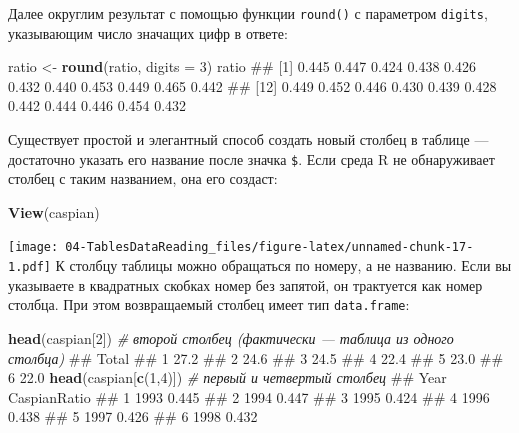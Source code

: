 \documentclass[]{book}
\newenvironment{Shaded}{\begin{snugshade}}{\end{snugshade}}
\newcommand{\KeywordTok}[1]{\textcolor[rgb]{0.13,0.29,0.53}{\textbf{#1}}}
\newcommand{\DataTypeTok}[1]{\textcolor[rgb]{0.13,0.29,0.53}{#1}}
\newcommand{\DecValTok}[1]{\textcolor[rgb]{0.00,0.00,0.81}{#1}}
\newcommand{\StringTok}[1]{\textcolor[rgb]{0.31,0.60,0.02}{#1}}
\newcommand{\CommentTok}[1]{\textcolor[rgb]{0.56,0.35,0.01}{\textit{#1}}}
\newcommand{\OperatorTok}[1]{\textcolor[rgb]{0.81,0.36,0.00}{\textbf{#1}}}
\newcommand{\NormalTok}[1]{#1}
\begin{document}
Далее округлим результат с помощью функции \texttt{round()} с параметром
\texttt{digits}, указывающим число значащих цифр в ответе:

\begin{Shaded}
\begin{Highlighting}[]
\NormalTok{ratio <-}\StringTok{ }\KeywordTok{round}\NormalTok{(ratio, }\DataTypeTok{digits =} \DecValTok{3}\NormalTok{)}
\NormalTok{ratio}
\NormalTok{##  [1] 0.445 0.447 0.424 0.438 0.426 0.432 0.440 0.453 0.449 0.465 0.442}
\NormalTok{## [12] 0.449 0.452 0.446 0.430 0.439 0.428 0.442 0.444 0.446 0.454 0.432}
\end{Highlighting}
\end{Shaded}

Существует простой и элегантный способ создать новый столбец в таблице
--- достаточно указать его название после значка \texttt{\$}. Если среда
R не обнаруживает столбец с таким названием, она его создаст:

\begin{Shaded}
\end{Shaded}

\begin{Shaded}
\begin{Highlighting}[]
\KeywordTok{View}\NormalTok{(caspian)}
\end{Highlighting}
\end{Shaded}

\texttt{[image: 04-TablesDataReading\_files/figure-latex/unnamed-chunk-17-1.pdf]}
К столбцу таблицы можно обращаться по номеру, а не названию. Если вы
указываете в квадратных скобках номер без запятой, он трактуется как
номер столбца. При этом возвращаемый столбец имеет тип
\texttt{data.frame}:

\begin{Shaded}
\begin{Highlighting}[]
\KeywordTok{head}\NormalTok{(caspian[}\DecValTok{2}\NormalTok{])  }\CommentTok{# второй столбец (фактически — таблица из одного столбца)}
\NormalTok{##   Total}
\NormalTok{## 1  27.2}
\NormalTok{## 2  24.6}
\NormalTok{## 3  24.5}
\NormalTok{## 4  22.4}
\NormalTok{## 5  23.0}
\NormalTok{## 6  22.0}
\KeywordTok{head}\NormalTok{(caspian[}\KeywordTok{c}\NormalTok{(}\DecValTok{1}\NormalTok{,}\DecValTok{4}\NormalTok{)])  }\CommentTok{# первый и четвертый столбец}
\NormalTok{##   Year CaspianRatio}
\NormalTok{## 1 1993        0.445}
\NormalTok{## 2 1994        0.447}
\NormalTok{## 3 1995        0.424}
\NormalTok{## 4 1996        0.438}
\NormalTok{## 5 1997        0.426}
\NormalTok{## 6 1998        0.432}
\end{Highlighting}
\end{Shaded}
\end{document}
